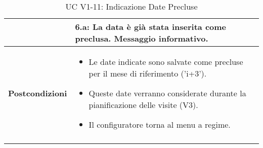 \documentclass[a4paper,12pt]{article}
\begin{document}
\begin{longtable}{@{} p{} p{} @{}}
                 & \textbf{6.a}: La data è già stata inserita come preclusa. Messaggio informativo. \\
\midrule
\textbf{Postcondizioni} &
\begin{itemize}[leftmargin=*]
    \item Le date indicate sono salvate come precluse per il mese di riferimento ('i+3').
    \item Queste date verranno considerate durante la pianificazione delle visite (V3).
    \item Il configuratore torna al menu a regime.
\end{itemize} \\
\bottomrule
\caption{UC V1-11: Indicazione Date Precluse} \label{uc:v1-11}
\end{longtable}
\end{document}
